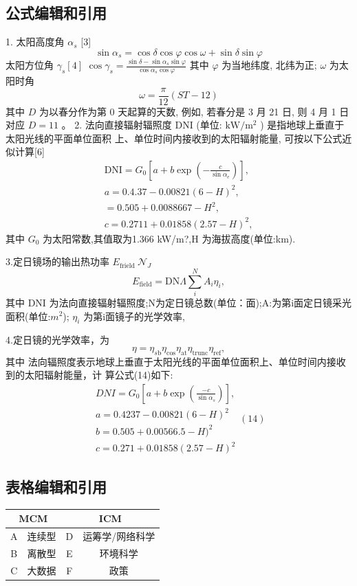 \documentclass[a4paper,12pt]{article}
\begin{document}
\subsection{公式编辑和引用}
    \setlength{\parindent}{2em}%
    1. 太阳高度角 \(\alpha_{s}\) [3] 
    \[\sin \alpha_s=\cos \delta \cos \varphi \cos \omega+\sin \delta \sin \varphi\]
    太阳方位角 \(\gamma_{s}[4]\)
    \(\cos \gamma_{s}=\frac{\sin \delta-\sin \alpha_{s} \sin \varphi}{\cos \alpha_{s} \cos \varphi}\)
    其中 \(\varphi\) 为当地纬度, 北纬为正; \(\omega\) 为太阳时角
    \[\omega=\frac{\pi}{12}(S T-12)\]
    其中 \(D\) 为以春分作为第 0 天起算的天数, 例如, 若春分是 3 月 21 日, 则 4 月 1 日对应 \(D=11\) 。
    2. 法向直接辐射辐照度 DNI (单位: \(\mathrm{kW} / \mathrm{m}^{2}\) ) 是指地球上垂直于太阳光线的平面单位面积
    上、单位时间内接收到的太阳辐射能量, 可按以下公式近似计算[6]
    $$
	\begin{array}{l}
        {\mathrm{DNI}=G_{0}\left[a+b\exp\left(-\frac{c}{\sin\alpha_{e}}\right)\right],}\\ 
        {a=0.4.37-0.00821(6-H)^{2},}\\ {=0.505+0.0088667-H^{2},}\\ 
        {c=0.2711+0.01858(2.57-H)^{2},}\end{array}
	$$
    其中
    $G_{\mathrm{0}}$ 
    为太阳常数,其值取为1.366 kW/m?,H 为海拔高度(单位:km).
    
    3.定日镜场的输出热功率
    $E_{\mathrm{frield}}\ {\mathcal{N}}_{J}$ 
    $$
        E_{\mathrm{field}}=\mathrm{DN}\Lambda\sum_{i}^{N}A_{i}\eta_{i},
	$$
    其中 DNI 为法向直接辐射辐照度;N为定日镜总数(单位：面);A:为第i面定日镜采光
	面积(单位:$m^{2}$);
	$\eta_{i}$ 
    为第i面镜子的光学效率,
	
    4.定日镜的光学效率，为
	$$
	    \eta=\eta_{s\mathrm{b}}\eta_{\mathrm{cos}}\eta_{\mathrm{at}}\eta_{\mathrm{trunc}}\eta_{\mathrm{ref}},
	$$
    其中
	法向辐照度表示地球上垂直于太阳光线的平面单位面积上、单位时间内接收到的太阳辐射能量，计
	算公式(14)如下:
	$$
	    \begin{array}{c}{{D N I=G_{0}\left[a+b\exp\left(\frac{-c}{\sin\alpha_{s}}\right)\right],}}\\ {{a=0.4237-0.00821(6-H)^{2}}}\\ {{b=0.505+0.00566.5-H)^{2}}}\\ {{c=0.271+0.01858(2.57-H)^{2}}}\end{array}
    (14)
	$$
    

\subsection{表格编辑和引用}
    \begin{tabular}{|c|c|c|c|}
        \hline
        \multicolumn{2}{|c|}{MCM} & \multicolumn{2}{|c|}{ICM} \\
        \hline
        A & 连续型 & D & 运筹学/网络科学\\
        \hline
        B & 离散型 & E & 环境科学\\
        \hline
        C & 大数据 & F & 政策\\
        \hline
    \end{tabular}
    
\end{document}
